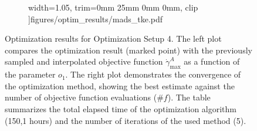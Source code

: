 \begin{figure}[H]
\begin{subfigure}{0.52\textwidth}
		width=1.05\textwidth,
		trim={0mm 25mm 0mm 0mm}, clip
		]{figures/optim_results/mads_tke.pdf}
	\end{subfigure}
	\vspace{2mm}
	\caption{Optimization results for Optimization Setup 4. The left plot compares the optimization result (marked point) with the previously sampled and interpolated objective function $\dot{\gamma}_{\text{max}}^{A}$ as a function of the parameter $o_1$. The right plot demonstrates the convergence of the optimization method, showing the best estimate against the number of objective function evaluations ($\# f$). The table summarizes the total elapsed time of the optimization algorithm (150,1 hours) and the number of iterations of the used method (5).}
\end{figure}
\newpage

